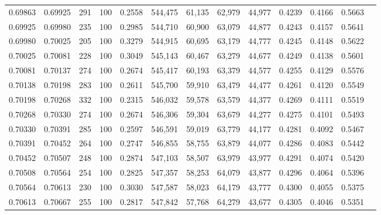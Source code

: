\begin{tabular}{rrrrrrrrrrrrr}
0.69863 & 0.69925 &   291 & 100 &                                     0.2558 & 544,475 &  61,135 &  62,979 &  44,977 & 0.4239 & 0.4166 & 0.5663 \\
0.69925 & 0.69980 &   235 & 100 &                                     0.2985 & 544,710 &  60,900 &  63,079 &  44,877 & 0.4243 & 0.4157 & 0.5641 \\
0.69980 & 0.70025 &   205 & 100 &                                     0.3279 & 544,915 &  60,695 &  63,179 &  44,777 & 0.4245 & 0.4148 & 0.5622 \\
0.70025 & 0.70081 &   228 & 100 &                                     0.3049 & 545,143 &  60,467 &  63,279 &  44,677 & 0.4249 & 0.4138 & 0.5601 \\
0.70081 & 0.70137 &   274 & 100 &                                     0.2674 & 545,417 &  60,193 &  63,379 &  44,577 & 0.4255 & 0.4129 & 0.5576 \\
0.70138 & 0.70198 &   283 & 100 &                                     0.2611 & 545,700 &  59,910 &  63,479 &  44,477 & 0.4261 & 0.4120 & 0.5549 \\
0.70198 & 0.70268 &   332 & 100 &                                     0.2315 & 546,032 &  59,578 &  63,579 &  44,377 & 0.4269 & 0.4111 & 0.5519 \\
0.70268 & 0.70330 &   274 & 100 &                                     0.2674 & 546,306 &  59,304 &  63,679 &  44,277 & 0.4275 & 0.4101 & 0.5493 \\
0.70330 & 0.70391 &   285 & 100 &                                     0.2597 & 546,591 &  59,019 &  63,779 &  44,177 & 0.4281 & 0.4092 & 0.5467 \\
0.70391 & 0.70452 &   264 & 100 &                                     0.2747 & 546,855 &  58,755 &  63,879 &  44,077 & 0.4286 & 0.4083 & 0.5442 \\
0.70452 & 0.70507 &   248 & 100 &                                     0.2874 & 547,103 &  58,507 &  63,979 &  43,977 & 0.4291 & 0.4074 & 0.5420 \\
0.70508 & 0.70564 &   254 & 100 &                                     0.2825 & 547,357 &  58,253 &  64,079 &  43,877 & 0.4296 & 0.4064 & 0.5396 \\
0.70564 & 0.70613 &   230 & 100 &                                     0.3030 & 547,587 &  58,023 &  64,179 &  43,777 & 0.4300 & 0.4055 & 0.5375 \\
0.70613 & 0.70667 &   255 & 100 &                                     0.2817 & 547,842 &  57,768 &  64,279 &  43,677 & 0.4305 & 0.4046 & 0.5351 \\

\end{tabular}
